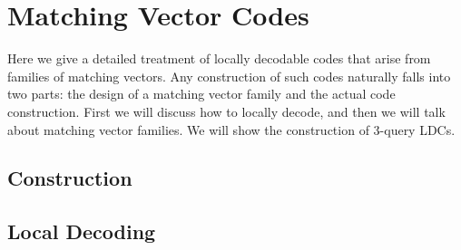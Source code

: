 \section{Matching Vector Codes}
Here we give a detailed treatment of locally decodable codes that arise from families of matching vectors. Any construction of such codes naturally falls into two parts: the design of a matching vector family and the actual code construction. First we will discuss how to locally decode, and then we will talk about matching vector families. We will show the construction of 3-query LDCs. 
\subsection{Construction}

\subsection{Local Decoding}